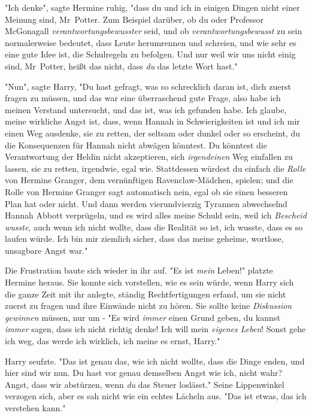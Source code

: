 {"Ich denke", sagte Hermine ruhig, "dass du und ich in einigen Dingen nicht einer Meinung sind, Mr~Potter. Zum Beispiel darüber, ob du oder Professor McGonagall \emph{verantwortungsbewusster} seid, und ob \emph{verantwortungsbewusst} zu sein normalerweise bedeutet, dass Leute herumrennen und schreien, und wie sehr es eine gute Idee ist, die Schulregeln zu befolgen. Und nur weil wir uns nicht einig sind, Mr~Potter, heißt das nicht, dass \emph{du} das letzte Wort hast."

"Nun", sagte Harry, "Du hast gefragt, was so schrecklich daran ist, dich zuerst fragen zu müssen, und das war eine überraschend gute Frage, also habe ich meinen Verstand untersucht, und das ist, was ich gefunden habe. Ich glaube, meine wirkliche Angst ist, dass, wenn Hannah in Schwierigkeiten ist und ich mir einen Weg ausdenke, sie zu retten, der seltsam oder dunkel oder so erscheint, du die Konsequenzen für Hannah nicht abwägen könntest. Du könntest die Verantwortung der Heldin nicht akzeptieren, sich \emph{irgendeinen} Weg einfallen zu lassen, sie zu retten, irgendwie, egal wie. Stattdessen würdest du einfach die \emph{Rolle} von Hermine Granger, dem vernünftigen Ravenclaw-Mädchen, spielen; und die Rolle von Hermine Granger sagt automatisch nein, egal ob sie einen besseren Plan hat oder nicht. Und dann werden vierundvierzig Tyrannen abwechselnd Hannah Abbott verprügeln, und es wird alles meine Schuld sein, weil ich \emph{Bescheid wusste}, auch wenn ich nicht wollte, dass die Realität so ist, ich wusste, dass es so laufen würde. Ich bin mir ziemlich sicher, dass das meine geheime, wortlose, unsagbare Angst war."

Die Frustration baute sich wieder in ihr auf. "Es ist \emph{mein} Leben!" platzte Hermine heraus. Sie konnte sich vorstellen, wie es sein würde, wenn Harry sich die ganze Zeit mit ihr anlegte, ständig Rechtfertigungen erfand, um sie nicht zuerst zu fragen und ihre Einwände nicht zu hören. Sie sollte keine \emph{Diskussion gewinnen} müssen, nur um - "Es wird \emph{immer} einen Grund geben, du kannst \emph{immer} sagen, dass ich nicht richtig denke! Ich will mein \emph{eigenes Leben}! Sonst gehe ich weg, das werde ich wirklich, ich meine es ernst, Harry."

Harry seufzte. "Das ist genau das, wie ich nicht wollte, dass die Dinge enden, und hier sind wir nun. Du hast vor genau demselben Angst wie ich, nicht wahr? Angst, dass wir abstürzen, wenn \emph{du} das Steuer loslässt." Seine Lippenwinkel verzogen sich, aber es sah nicht wie ein echtes Lächeln aus. "Das ist etwas, das ich verstehen kann."

}
